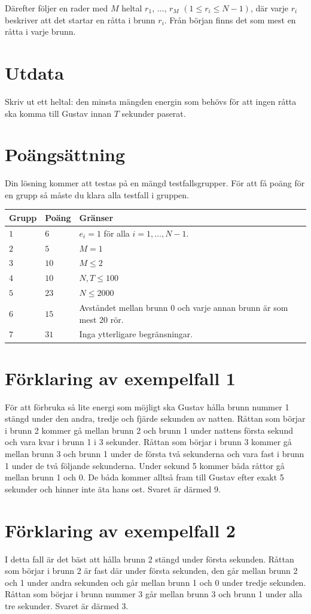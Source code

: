 Därefter följer en rader med $M$ heltal $r_1$, $\dots$, $r_M$ $(1 \leq r_i \leq N-1)$, där varje $r_i$ beskriver
att det startar en råtta i brunn $r_i$. Från början finns det som mest en råtta i varje brunn.

\section*{Utdata}
Skriv ut ett heltal: den minsta mängden energin som behövs för att ingen råtta ska komma till Gustav innan $T$
sekunder paserat. 


\section*{Poängsättning}
Din lösning kommer att testas på en mängd testfallsgrupper.
För att få poäng för en grupp så måste du klara alla testfall i gruppen.

\noindent
\begin{tabular}{| l | l | p{12cm} |}
  \hline
  \textbf{Grupp} & \textbf{Poäng} & \textbf{Gränser} \\ \hline
  $1$ & $6$   & $e_i = 1$ för alla $i = 1, \dots, N-1$. \\ \hline 
  $2$ & $5$   & $M = 1$ \\ \hline
  $3$ & $10$  & $M \leq 2$ \\ \hline
  $4$ & $10$  & $N, T \leq 100$ \\ \hline
  $5$ & $23$  & $N \leq 2000$ \\ \hline
  $6$ & $15$  & Avståndet mellan brunn $0$ och varje annan brunn är som mest 20 rör. \\ \hline
  $7$ & $31$  & Inga ytterligare begränsningar. \\ \hline
\end{tabular}


\section*{Förklaring av exempelfall 1}

För att förbruka så lite energi som möjligt ska Gustav hålla brunn nummer 1 stängd under den andra, tredje
och fjärde sekunden av natten. Råttan som börjar i brunn 2 kommer gå mellan brunn 2 och brunn 1 under nattens
första sekund och vara kvar i brunn 1 i 3 sekunder.
Råttan som börjar i brunn 3 kommer gå mellan brunn 3 och brunn 1 under de första två sekunderna och vara fast
i brunn 1 under de två följande sekunderna. Under sekund 5 kommer båda råttor gå mellan brunn 1 och 0. De båda
kommer alltså fram till Gustav efter exakt 5 sekunder och hinner inte äta hans ost. 
Svaret är därmed 9.

\section*{Förklaring av exempelfall 2}

I detta fall är det bäst att hålla brunn 2 stängd under första sekunden. Råttan som börjar i brunn 2 är fast
där under första sekunden, den går mellan brunn 2 och 1 under andra sekunden och går mellan brunn 1 och 0 under
tredje sekunden. Råttan som börjar i brunn nummer 3 går mellan brunn 3 och brunn 1 under alla tre sekunder. Svaret
är därmed 3.
